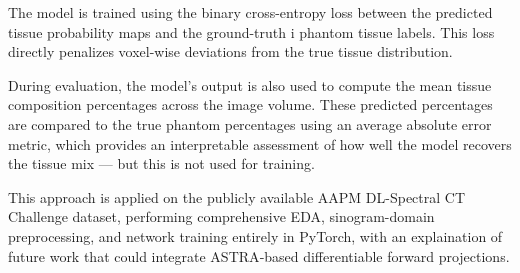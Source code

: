 The model is trained using the binary cross-entropy loss between the predicted tissue probability maps and the ground-truth i
phantom tissue labels. This loss directly penalizes voxel-wise deviations from the true tissue distribution.

During evaluation, the model’s output is also used to compute the mean tissue composition percentages across the image volume. 
These predicted percentages are compared to the true phantom percentages using an average absolute error metric, which provides 
an interpretable assessment of how well the model recovers the tissue mix — but this is not used for training.

This approach is applied on the publicly available AAPM DL-Spectral CT Challenge dataset, performing comprehensive
EDA, sinogram-domain preprocessing, and network training entirely in PyTorch, with an explaination of future work that could
integrate ASTRA‐based differentiable forward projections.
